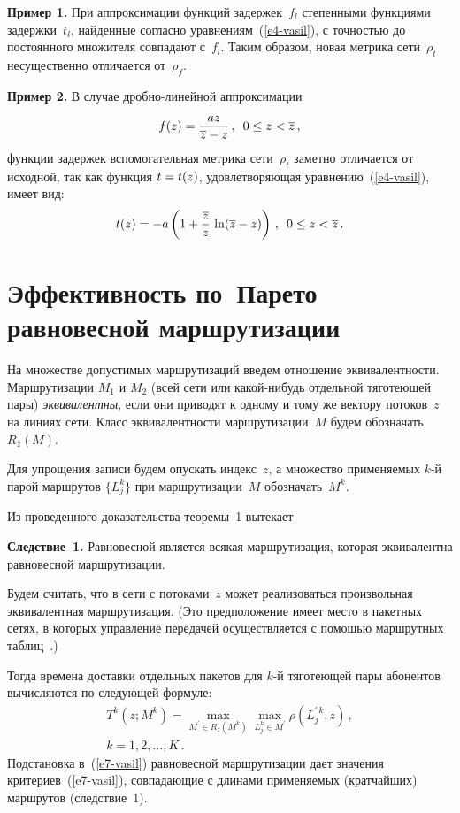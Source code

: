 \begin{multicols}{2}
  \medskip
  
  \noindent
  \textbf{Пример 1.} При аппроксимации функций задержек~$f_l$ степенными 
функциями задержки~$t_l$, найден\-ные согласно уравнениям~(\ref{e4-vasil}), с 
точностью до постоянного множителя совпадают с~$f_l$. Таким образом, новая 
метрика сети~$\rho_t$ несущественно отличается от~$\rho_f$.
  
  \medskip
  
  \noindent
  \textbf{Пример 2.} В случае дроб\-но-ли\-ней\-ной аппроксимации
  $$
  f(z)=\displaystyle\frac{\displaystyle az\mathstrut}{\displaystyle \overline{z}-z\mathstrut}\,,\enskip 0\leq z< \overline{z}\,,
  $$
функции задержек вспомогательная метрика сети~$\rho_t$ заметно отличается от 
исходной, так как функция $t\hm=t(z)$, удовлетворяющая 
уравнению~(\ref{e4-vasil}), имеет вид: 
$$
t(z) =-a\left( 1+\displaystyle\frac{\displaystyle \overline{z}\mathstrut}{\displaystyle z\mathstrut}\,\ln (\overline{z}-z)\right)\,,\enskip 0\leq 
z<\overline{z}\,.
$$
  
  \section{Эффективность по~Парето равновесной маршрутизации}
  
   На множестве допустимых маршрутизаций введем отношение эквивалентности. 
Маршрутизации $M_1$ и $M_2$ (всей сети или какой-нибудь отдельной тяготеющей 
пары) \textit{эквивалентны}, если они приводят к одному и тому же вектору 
потоков~$z$ на линиях сети. Класс эквивалентности маршрутизации~$M$ будем 
обозначать $R_z(M)$. 
  
  Для упрощения записи будем опускать индекс~$z$, а множество применяемых 
  $k$-й парой маршрутов $\{L_j^k\}$ при маршрутизации~$M$ обозначать~$M^k$.
  
  Из проведенного доказательства теоремы~1 вытекает
  
  \smallskip
  
  \noindent
  \textbf{Следствие~1.} Равновесной является всякая маршрутизация, которая 
эквивалентна равновесной маршрутизации.
  
  Будем считать, что в сети с потоками~$z$ может реализоваться произвольная 
эквивалентная маршрутизация. (Это предположение имеет место в пакетных сетях, 
в которых управление передачей осущест\-вля\-ет\-ся с помощью маршрутных 
  таб\-лиц~\cite{1-vasil}.) 
  
  Тогда времена доставки отдельных пакетов для $k$-й тяготеющей пары 
абонентов вычисляются по следующей формуле:
  \begin{multline}
  T^k(z;M^k) =\max\limits_{M^\prime\in R_z(M^k)} \max\limits_{L_j^k\in M^\prime} 
\rho(L_j^{\prime\,k}, z)\,, \\ k=1,2,\ldots, K\,.
  \label{e7-vasil}
  \end{multline}
  Подстановка в~(\ref{e7-vasil}) равновесной маршрутизации дает значения 
критериев~(\ref{e7-vasil}), совпадающие с длинами применяемых (кратчайших) 
маршрутов (следствие~1).
  

\end{multicols}
